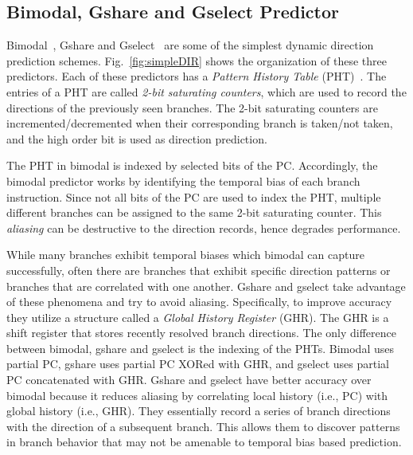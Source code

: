 \subsection{Bimodal, Gshare and Gselect Predictor}
\label{sec:background:dirpred:bimodal}
Bimodal~\cite{bimodal}, Gshare and Gselect~\cite{McFarling} are some of the simplest dynamic direction prediction schemes. Fig.~\ref{fig:simpleDIR} shows the organization of these three predictors. Each of these predictors has a \textit{Pattern History Table} (PHT)~\cite{pht}. The entries of a PHT are called \textit{2-bit saturating counters}, which are used to record the directions of the previously seen branches. The 2-bit saturating counters are incremented/decremented when their corresponding branch is taken/not taken, and the high order bit is used as direction prediction.

The PHT in bimodal is indexed by selected bits of the PC. Accordingly, the bimodal predictor works by identifying the temporal bias of each branch instruction. Since not all bits of the PC are used to index the PHT, multiple different branches can be assigned to the same 2-bit saturating counter. This \textit{aliasing} can be destructive to the direction records, hence degrades performance.

While many branches exhibit temporal biases which bimodal can capture successfully, often there are branches that exhibit specific direction patterns or branches that are correlated with one another. Gshare and gselect take advantage of these phenomena and try to avoid aliasing. Specifically, to improve accuracy they utilize a structure called a \textit{Global History Register} (GHR). The GHR is a shift register that stores recently resolved branch directions. The only difference between bimodal, gshare and gselect is the indexing of the PHTs. Bimodal uses partial PC, gshare uses partial PC XORed with GHR, and gselect uses partial PC concatenated with GHR. Gshare and gselect have better accuracy over bimodal because it reduces aliasing by correlating local history (i.e., PC) with global history (i.e., GHR).
They essentially record a series of branch directions with the direction of a subsequent branch. This allows them  to discover patterns in branch behavior that may not be amenable to temporal bias based prediction.



